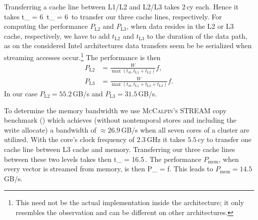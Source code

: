 Transferring a cache line between L1/L2 and L2/L3 takes $2$\,cy each.
Hence it takes
%
\be
  t_ = 6\, \qquad {} \qquad t_ = 6\,
\ee
%
to transfer our three cache lines, respectively.
For computing the performance $P_\text{L2}$ and $P_\text{L3}$, when data resides
in the L2 or L3 cache, respectively, we have to add $t_\text{L2}$ and $t_\text{L3}$
to the duration of the data path, as on the considered Intel architectures data
transfers seem be be serialized when streaming accesses occur.\footnote{This need
not be the actual implementation inside the architecture; it only resembles
the observation and can be different on other architectures.}
The performance is then
%
\begin{align}
  P_\text{L2} &= \frac{W}{\max(t_\text{ol}, t_\text{L1} + t_\text{L2})} f, \\
  P_\text{L3} &= \frac{W}{\max(t_\text{ol}, t_\text{L1} + t_\text{L2} +
t_\text{L3})} f.
\end{align}
%
In our case $P_\text{L2} = 55.2$\,GB/s and $P_\text{L3} = 31.5$\,GB/s.
%

To determine the memory bandwidth we use \textsc{McCalpin's} STREAM copy
benchmark (\cite{mccalpin-1995}) which achieves (without nontemporal stores and
including the write allocate) a bandwidth of $\approx 26.9$\,GB/s when all seven cores
of a cluster are utilized.
With the core's clock frequency of $2.3$\,GHz it takes $5.5$\,cy to transfer one
cache line between L3 cache and memory.
Transferring our three cache lines between these two levels takes then
%
\be
  t_ = 16.5\,.
\ee
%
The performance $P_\text{mem}$, when every vector is streamed from memory, is then
%
\be
  P_ =  f.
\ee
%
This leads to $P_\text{mem} = 14.5$\,GB/s. 

